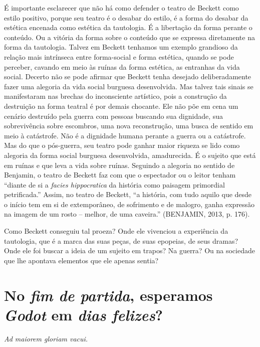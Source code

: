 É importante esclarecer que não há como defender o teatro de Beckett
como estilo positivo, porque seu teatro é o desabar do estilo, é a forma
do desabar da estética encenada como estética da tautologia. É a
libertação da forma perante o conteúdo. Ou a vitória da forma sobre o
conteúdo que se expressa diretamente na forma da tautologia. Talvez em
Beckett tenhamos um exemplo grandioso da relação mais intrínseca entre
forma-social e forma estética, quando se pode perceber, cavando em meio
às ruínas da forma estética, as entranhas da vida social. Decerto não se
pode afirmar que Beckett tenha desejado deliberadamente fazer uma
alegoria da vida social burguesa desenvolvida. Mas talvez tais sinais se
manifestaram nas brechas do inconsciente artístico, pois a construção da
destruição na forma teatral é por demais chocante. Ele não põe em cena
um cenário destruído pela guerra com pessoas buscando sua dignidade, sua
sobrevivência sobre escombros, uma nova reconstrução, uma busca de
sentido em meio à catástrofe. Não é a dignidade humana perante a guerra
ou a catástrofe. Mas do que o pós-guerra, seu teatro pode ganhar maior
riqueza se lido como alegoria da forma social burguesa desenvolvida,
amadurecida. É o sujeito que está em ruínas e que leva a vida sobre
ruínas. Seguindo a alegoria no sentido de Benjamin, o teatro de Beckett
faz com que o espectador ou o leitor tenham ``diante de si a
\emph{facies hippocratica} da história como paisagem primordial
petrificada.'' Assim, no teatro de Beckett, ``a história, com tudo
aquilo que desde o início tem em si de extemporâneo, de sofrimento e de
malogro, ganha expressão na imagem de um rosto -- melhor, de uma
caveira.'' (BENJAMIN, 2013, p. 176).

Como Beckett conseguiu tal proeza? Onde ele vivenciou a experiência da
tautologia, que é a marca das suas peças, de suas epopeias, de seus
dramas? Onde ele foi buscar a ideia de um sujeito em trapos? Na guerra?
Ou na sociedade que lhe apontava elementos que ele apenas sentia?

\section{No \emph{fim de partida}, esperamos \emph{Godot} em \emph{dias felizes}?}

\emph{Ad maiorem gloriam vacui.}

